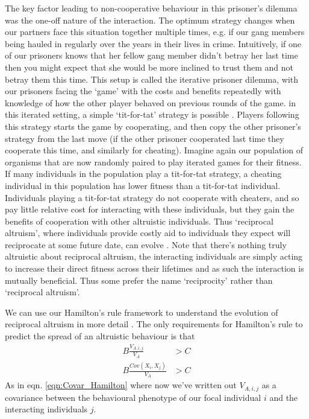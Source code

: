 The key factor leading to non-cooperative behaviour in this prisoner's
dilemma was the one-off nature of the interaction. The optimum
strategy changes when our partners face this situation together
multiple times, e.g. if our gang members being hauled in regularly
over the years in their lives in crime. Intuitively, if one of our
prisoners knows that her fellow gang member didn't betray her last
time then you might expect that she would be more inclined to trust
them and not betray them this time. This setup is called the iterative
prisoner dilemma, with our prisoners facing the `game' with the costs
and benefits repeatedly with knowledge of how the other player behaved
on previous rounds of the game.  in this iterated setting, a simple
`tit-for-tat'  strategy is possible \citep{axelrod1981evolution}. Players following this strategy
starts the game by cooperating, and then copy the other prisoner's
strategy from the last move (if the other prisoner cooperated last time
they cooperate this time, and similarly for cheating). Imagine again
our population of organisms that are now randomly paired to play
iterated games for their fitness. If many individuals in the
population play a tit-for-tat strategy, a cheating individual in this
population has lower fitness than a tit-for-tat
individual. Individuals playing a tit-for-tat strategy do not
cooperate with cheaters, and so pay little relative cost for
interacting with these individuals, but they gain the benefits of
cooperation with other altruistic individuals. Thus `reciprocal
altruism', where individuals provide costly aid to individuals they
expect will reciprocate at some future date, can evolve \citep{trivers1971evolution}. Note that there's nothing truly altruistic about reciprocal
altruism, the interacting individuals are simply acting to increase their direct
fitness across their lifetimes and as such the interaction is mutually beneficial. Thus some
prefer the name `reciprocity' rather than `reciprocal altruism'.

We can use our Hamilton's rule framework to understand the evolution
of reciprocal altruism in more detail \citep{queller2011expanded}. The
only requirements for Hamilton's rule to predict the spread of an
altruistic behaviour is that
\begin{eqnarray}
 B \frac{V_{A,i,j}}{V_A} & >  C  \nonumber \\
 B \frac{Cov(X_i,X_j)}{V_A} & >  C  
\end{eqnarray}
As in eqn. \eqref{eqn:Covar_Hamilton} where now we've written out
$V_{A,i,j}$ as a covariance between the behavioural phenotype of our
focal individual $i$ and the interacting individuals $j$.

